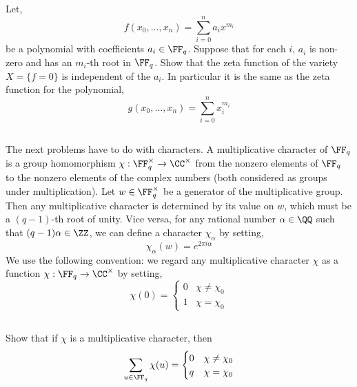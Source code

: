\documentclass[12pt]{article}
\begin{document}
\subsection{}

Let,
\[ f(x_0, \dots, x_n) = \sum_{i = 0}^n a_i x^{m_i} \]
be a polynomial with coefficients $a_i \in \FF_q$. Suppose that for each $i$, $a_i$ is non-zero and has an $m_i$-th root in $\FF_q$. Show that the zeta function of the variety $X = \{ f = 0 \}$ is independent of the $a_i$. In particular it is the same as the zeta function for the polynomial,
\[ g(x_0, \dots, x_n) = \sum_{i = 0}^n x_i^{m_i} \]

\subsection{}

The next problems have to do with characters. A multiplicative character of $\FF_q$ is a group homomorphism $\chi : \FF_q^\times \to \CC^\times$ from the nonzero elements of $\FF_q$ to the nonzero elements of the complex numbers (both considered as groups under multiplication). Let $w \in \FF_q^\times$ be a generator of the multiplicative group. Then any multiplicative character is determined by its value on $w$, which must be a $(q-1)$-th root of unity. Vice versa, for any rational number $\alpha \in \QQ$ such that $(q-1) \alpha \in \ZZ$, we can define a character $\chi_\alpha$ by setting,
\[ \chi_\alpha(w) = e^{2 \pi i \alpha} \]
We use the following convention: we regard any multiplicative character $\chi$ as a function $\chi : \FF_q \to \CC^\times$ by setting,
\[ \chi(0) = 
\begin{cases}
0 & \chi \neq \chi_0
\\
1 & \chi = \chi_0 
\end{cases} \]

\subsection{}

Show that if $\chi$ is a multiplicative character, then
\[ \sum_{u \in \FF_q} \chi(u) = 
\begin{cases}
0 & \chi \neq \chi_0
\\
q & \chi = \chi_0 
\end{cases} \]

\subsection{}
\end{document}
